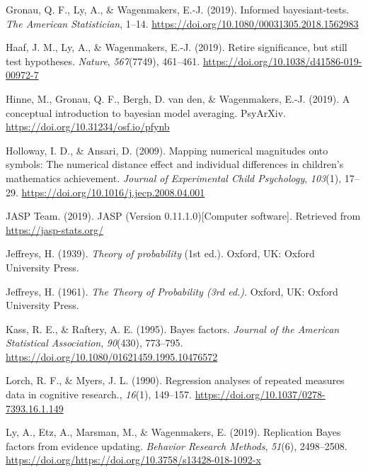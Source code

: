 \documentclass[english,,doc,floatsintext]{apa6}
\begin{document}
\leavevmode\hypertarget{ref-gronau2019}{}%
Gronau, Q. F., Ly, A., \& Wagenmakers, E.-J. (2019). Informed bayesiant-tests. \emph{The American Statistician}, 1--14. \url{https://doi.org/10.1080/00031305.2018.1562983}

\leavevmode\hypertarget{ref-haaf2019}{}%
Haaf, J. M., Ly, A., \& Wagenmakers, E.-J. (2019). Retire significance, but still test hypotheses. \emph{Nature}, \emph{567}(7749), 461--461. \url{https://doi.org/10.1038/d41586-019-00972-7}

\leavevmode\hypertarget{ref-hinneBMA}{}%
Hinne, M., Gronau, Q. F., Bergh, D. van den, \& Wagenmakers, E.-J. (2019). A conceptual introduction to bayesian model averaging. PsyArXiv. \url{https://doi.org/10.31234/osf.io/pfynb}

\leavevmode\hypertarget{ref-hollowayAnsari2009}{}%
Holloway, I. D., \& Ansari, D. (2009). Mapping numerical magnitudes onto symbols: The numerical distance effect and individual differences in children's mathematics achievement. \emph{Journal of Experimental Child Psychology}, \emph{103}(1), 17--29. \url{https://doi.org/10.1016/j.jecp.2008.04.001}

\leavevmode\hypertarget{ref-jaspSoftware}{}%
JASP Team. (2019). JASP (Version 0.11.1.0){[}Computer software{]}. Retrieved from \url{https://jasp-stats.org/}

\leavevmode\hypertarget{ref-jeffreys1939theory1}{}%
Jeffreys, H. (1939). \emph{Theory of probability} (1st ed.). Oxford, UK: Oxford University Press.

\leavevmode\hypertarget{ref-jeffreys1961}{}%
Jeffreys, H. (1961). \emph{The Theory of Probability (3rd ed.)}. Oxford, UK: Oxford University Press.

\leavevmode\hypertarget{ref-kass1995}{}%
Kass, R. E., \& Raftery, A. E. (1995). Bayes factors. \emph{Journal of the American Statistical Association}, \emph{90}(430), 773--795. \url{https://doi.org/10.1080/01621459.1995.10476572}

\leavevmode\hypertarget{ref-lorch1990}{}%
Lorch, R. F., \& Myers, J. L. (1990). Regression analyses of repeated measures data in cognitive research., \emph{16}(1), 149--157. \url{https://doi.org/10.1037/0278-7393.16.1.149}

\leavevmode\hypertarget{ref-ly2019replication}{}%
Ly, A., Etz, A., Marsman, M., \& Wagenmakers, E. (2019). Replication Bayes factors from evidence updating. \emph{Behavior Research Methods}, \emph{51}(6), 2498--2508. \url{https://doi.org/https://doi.org/10.3758/s13428-018-1092-x}
\end{document}
